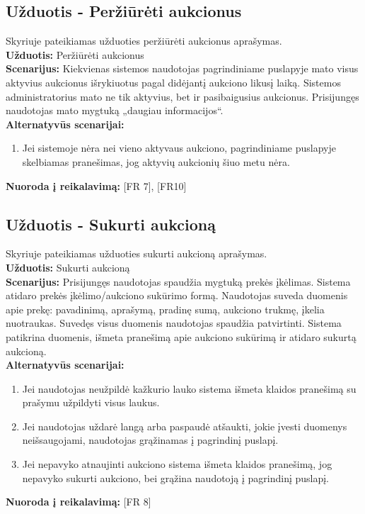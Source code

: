 \documentclass{VUMIFPSkursinis}
\begin{document}
	\subsection{Užduotis - Peržiūrėti aukcionus}
	Skyriuje pateikiamas užduoties peržiūrėti aukcionus aprašymas.\\
	\textbf{Užduotis:}  Peržiūrėti aukcionus \\
	\textbf{Scenarijus:} Kiekvienas sistemos naudotojas pagrindiniame puslapyje mato visus aktyvius aukcionus išrykiuotus pagal didėjantį aukciono likusį laiką. Sistemos administratorius mato ne tik aktyvius, bet ir pasibaigusius aukcionus. Prisijungęs naudotojas mato mygtuką „daugiau informacijos“. \\
	\textbf{Alternatyvūs scenarijai:}
	\begin{enumerate}
		\item Jei sistemoje nėra nei vieno aktyvaus aukciono, pagrindiniame puslapyje skelbiamas pranešimas, jog aktyvių aukcionių šiuo metu nėra. 
	\end{enumerate}
	\textbf{Nuoroda į reikalavimą: } [FR 7], [FR10]
	
	\subsection{Užduotis - Sukurti aukcioną}
	Skyriuje pateikiamas užduoties sukurti aukcioną aprašymas.\\
	\textbf{Užduotis:}  Sukurti aukcioną \\
	\textbf{Scenarijus:}  Prisijungęs naudotojas spaudžia mygtuką prekės įkėlimas. Sistema atidaro prekės įkėlimo/aukciono sukūrimo formą. Naudotojas suveda duomenis apie prekę: pavadinimą, aprašymą, pradinę sumą, aukciono trukmę, įkelia nuotraukas. Suvedęs visus duomenis naudotojas spaudžia patvirtinti. Sistema patikrina duomenis, išmeta pranešimą apie aukciono sukūrimą ir atidaro sukurtą aukcioną.\\
	\textbf{Alternatyvūs scenarijai:}
	\begin{enumerate}
		\item Jei naudotojas neužpildė kažkurio lauko sistema išmeta klaidos pranešimą su prašymu užpildyti visus laukus. 
		\item Jei naudotojas uždarė langą arba paspaudė atšaukti, jokie įvesti duomenys neišsaugojami, naudotojas grąžinamas į pagrindinį puslapį. 
		\item Jei nepavyko atnaujinti aukciono sistema išmeta klaidos pranešimą, jog nepavyko sukurti aukciono, bei grąžina naudotoją į pagrindinį puslapį. 
	\end{enumerate}
	\textbf{Nuoroda į reikalavimą: } [FR 8]
	
\end{document}
